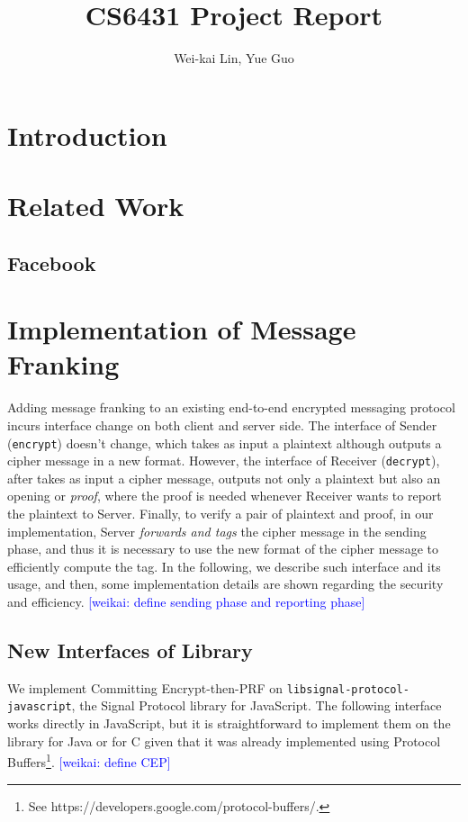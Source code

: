 \documentclass{article}
\title{CS6431 Project Report}
\author{Wei-kai Lin, Yue Guo}
\newcommand{\weikai}[1]{\textcolor{blue}{[weikai: #1]}}
\begin{document}
\maketitle

\begin{abstract}
    
\end{abstract}

\section{Introduction}

\section{Related Work}
\subsection{Facebook}


\section{Implementation of Message Franking}

Adding message franking to an existing end-to-end encrypted
messaging protocol incurs interface change on both client and server side.
The interface of Sender ({\tt encrypt}) doesn't change,
which takes as input a plaintext
although outputs a cipher message in a new format.
However, the interface of Receiver ({\tt decrypt}),
after takes as input a cipher message,
outputs not only a plaintext but also an opening or \emph{proof},
where the proof is needed 
whenever Receiver wants to report the plaintext to Server.
Finally, to verify a pair of plaintext and proof,
in our implementation,
Server \emph{forwards and tags} the cipher message in the sending phase,
and thus it is necessary to use the new format of the cipher message
to efficiently compute the tag.
In the following, we describe such interface and its usage,
and then, some implementation details are shown 
regarding the security and efficiency.
\weikai{define sending phase and reporting phase}

\subsection{New Interfaces of Library}

We implement Committing Encrypt-then-PRF on {\tt libsignal-protocol-javascript},
the Signal Protocol library for JavaScript.
The following interface works directly in JavaScript,
but it is straightforward to 
implement them on the library for Java or for C
given that it was already implemented using Protocol Buffers\footnote{
See https://developers.google.com/protocol-buffers/.
}.
\weikai{define CEP}
\end{document}
